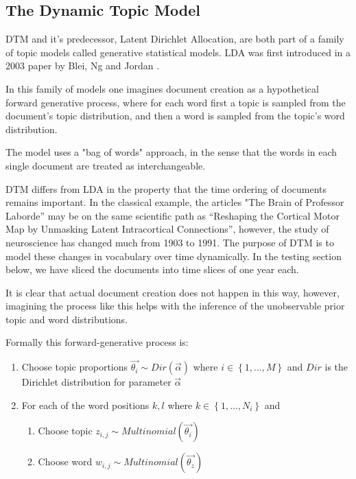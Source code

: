 \documentclass[12pt,journal,letterpaper,oneside,onecolumn]{IEEEtran}
\begin{document}
\subsection{The Dynamic Topic Model}
DTM \cite{BleiLafferty2006} and it's predecessor, Latent Dirichlet Allocation, are both part of a family of topic models called generative statistical models. LDA was first introduced in a 2003 paper by Blei, Ng and Jordan \cite{BleiJordan2003}.

In this family of models one imagines document creation as a hypothetical forward generative process, where for each word first a topic is sampled from the document's topic distribution, and then a word is sampled from the topic's word distribution.

The model uses a "bag of words" approach, in the sense that the words in each single document are treated as interchangeable. 

DTM differs from LDA in the property that the time ordering of documents remains important. In the classical example, the articles "The Brain of Professor Laborde” may be on the same scientific path as “Reshaping the Cortical Motor Map by Unmasking Latent Intracortical Connections”, however, the study of neuroscience has changed much from 1903 to 1991.
The purpose of DTM is to model these changes in vocabulary over time dynamically.
In the testing section below, we have sliced the documents into time slices of one year each.

It is clear that actual document creation does not happen in this way, however, imagining the process like this helps with the inference of the unobservable prior topic and word distributions. 

Formally this forward-generative process is:
\begin{enumerate}
	\item Choose topic proportions $\vec{\theta_i} \sim Dir ( \vec{\alpha} ) $ where $i \in \left\{1,...,M \right\} $ and $Dir$ is the Dirichlet distribution for parameter $\vec{\alpha}$ \\

	\item For each of the word positions $k,l$ where $k \in \left\{ 1,...,N_i \right\} $ and 
	\begin{enumerate}
		\item Choose topic $z_{i,j} \sim Multinomial(\vec{\theta_i})$
		\item Choose word $w_{i,j} \sim Multinomial(\vec{\theta_z})$
	\end{enumerate}
\end{enumerate}
\end{document}
